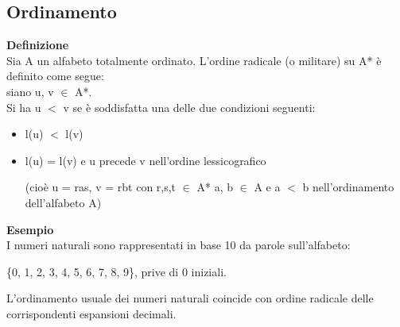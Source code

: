 \subsection{Ordinamento}
\textbf{Definizione}\\
Sia A un alfabeto totalmente ordinato. L’ordine radicale (o militare) su A* è definito come segue:\\ 
siano u, v $\in$ A*.\\
Si ha u $<$ v se è soddisfatta una delle due condizioni seguenti:
\begin{itemize}
    \item l(u) $<$ l(v)
    
    \item l(u) = l(v) e u precede v nell’ordine lessicografico 
    
    (cioè u = ras, v = rbt con r,s,t $\in$ A* a, b $\in$ A e a $<$ b nell’ordinamento dell’alfabeto A)
\end{itemize}
\textbf{Esempio}\\
I numeri naturali sono rappresentati in base 10 da parole sull’alfabeto:
\begin{center}
    \{0, 1, 2, 3, 4, 5, 6, 7, 8, 9\}, prive di 0 iniziali.
\end{center}
L’ordinamento usuale dei numeri naturali coincide con ordine radicale delle corrispondenti espansioni decimali.
